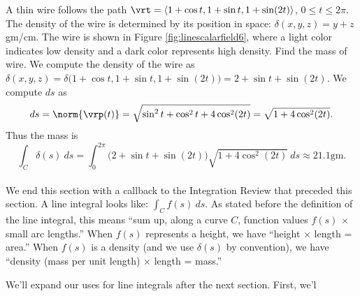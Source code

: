 {A thin wire follows the path $\vrt = \langle 1+\cos t,1+\sin t, 1+ \sin(2t)\rangle$, $0\leq t\leq 2\pi$. The density of the wire is determined by its position in space: $\delta(x,y,z) = y+z$ gm/cm. The wire is shown in Figure \ref{fig:linescalarfield6}, where a light color indicates low density and a dark color represents high density. Find the mass of wire.
}
{We compute the density of the wire as $\delta(x,y,z) = \delta\big(1+\cos t,1+\sin t, 1+\sin(2t)\big) = 2+\sin t+\sin(2t)$. We compute $ds$ as
$$ds = \norm{\vrp(t)} = \sqrt{\sin^2t+\cos^2t+4\cos^2(2t)} = \sqrt{1+4\cos^2(2t)}.$$
Thus the mass is
$$\int_C \delta(s)\ ds = \int_0^{2\pi} \big(2+\sin t+\sin(2t)\big)\sqrt{1+4\cos^2(2t)}\ ds \approx 21.1\text{gm}. $$
}\\

We end this section with a callback to the Integration Review that preceded this section. A line integral looks like: $\int_C f(s)\ ds$. As stated before the definition of the line integral, this means ``sum up, along a curve $C$, function values $f(s)$ $\times$ small arc lengths.'' When $f(s)$ represents a height, we have ``height $\times$ length = area.'' When $f(s)$ is a density (and we use $\delta(s)$ by convention), we have ``density (mass per unit length) $\times$ length = mass.''

We'll expand our uses for line integrals after the next section. First, we'l

